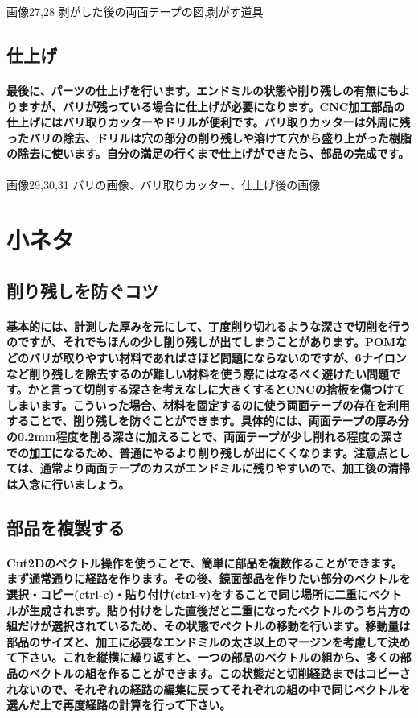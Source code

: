 \documentclass[b5paper, 9pt, twocolumn, titlepage,openany]{jsbook}%
\begin{document}
画像27,28 剥がした後の両面テープの図,剥がす道具

\subsection{仕上げ}
\paragraph{最後に、パーツの仕上げを行います。エンドミルの状態や削り残しの有無にもよりますが、バリが残っている場合に仕上げが必要になります。CNC加工部品の仕上げにはバリ取りカッターやドリルが便利です。バリ取りカッターは外周に残ったバリの除去、ドリルは穴の部分の削り残しや溶けて穴から盛り上がった樹脂の除去に使います。自分の満足の行くまで仕上げができたら、部品の完成です。}

画像29,30,31 バリの画像、バリ取りカッター、仕上げ後の画像

\section{小ネタ}
\subsection{削り残しを防ぐコツ}
\paragraph{基本的には、計測した厚みを元にして、丁度削り切れるような深さで切削を行うのですが、それでもほんの少し削り残しが出てしまうことがあります。POMなどのバリが取りやすい材料であればさほど問題にならないのですが、6ナイロンなど削り残しを除去するのが難しい材料を使う際にはなるべく避けたい問題です。かと言って切削する深さを考えなしに大きくするとCNCの捨板を傷つけてしまいます。こういった場合、材料を固定するのに使う両面テープの存在を利用することで、削り残しを防ぐことができます。具体的には、両面テープの厚み分の0.2mm程度を削る深さに加えることで、両面テープが少し削れる程度の深さでの加工になるため、普通にやるより削り残しが出にくくなります。注意点としては、通常より両面テープのカスがエンドミルに残りやすいので、加工後の清掃は入念に行いましょう。}

\subsection{部品を複製する}
\paragraph{Cut2Dのベクトル操作を使うことで、簡単に部品を複数作ることができます。まず通常通りに経路を作ります。その後、鏡面部品を作りたい部分のベクトルを選択・コピー(ctrl-c)・貼り付け(ctrl-v)をすることで同じ場所に二重にベクトルが生成されます。貼り付けをした直後だと二重になったベクトルのうち片方の組だけが選択されているため、その状態でベクトルの移動を行います。移動量は部品のサイズと、加工に必要なエンドミルの太さ以上のマージンを考慮して決めて下さい。これを縦横に繰り返すと、一つの部品のベクトルの組から、多くの部品のベクトルの組を作ることができます。この状態だと切削経路まではコピーされないので、それぞれの経路の編集に戻ってそれぞれの組の中で同じベクトルを選んだ上で再度経路の計算を行って下さい。}
\end{document}
